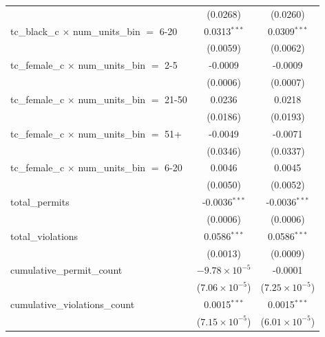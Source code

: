 \begin{tabular}{lcc}
                                                         & (0.0268)                & (0.0260)\\   
   tc\_black\_c $\times$ num\_units\_bin $=$ 6-20        & 0.0313$^{***}$          & 0.0309$^{***}$\\   
                                                         & (0.0059)                & (0.0062)\\   
   tc\_female\_c $\times$ num\_units\_bin $=$ 2-5        & -0.0009                 & -0.0009\\   
                                                         & (0.0006)                & (0.0007)\\   
   tc\_female\_c $\times$ num\_units\_bin $=$ 21-50      & 0.0236                  & 0.0218\\   
                                                         & (0.0186)                & (0.0193)\\   
   tc\_female\_c $\times$ num\_units\_bin $=$ 51+        & -0.0049                 & -0.0071\\   
                                                         & (0.0346)                & (0.0337)\\   
   tc\_female\_c $\times$ num\_units\_bin $=$ 6-20       & 0.0046                  & 0.0045\\   
                                                         & (0.0050)                & (0.0052)\\   
   total\_permits                                        & -0.0036$^{***}$         & -0.0036$^{***}$\\   
                                                         & (0.0006)                & (0.0006)\\   
   total\_violations                                     & 0.0586$^{***}$          & 0.0586$^{***}$\\   
                                                         & (0.0013)                & (0.0009)\\   
   cumulative\_permit\_count                             & $-9.78\times 10^{-5}$   & -0.0001\\   
                                                         & ($7.06\times 10^{-5}$)  & ($7.25\times 10^{-5}$)\\    
   cumulative\_violations\_count                         & 0.0015$^{***}$          & 0.0015$^{***}$\\   
                                                         & ($7.15\times 10^{-5}$)  & ($6.01\times 10^{-5}$)\\    

\end{tabular}
